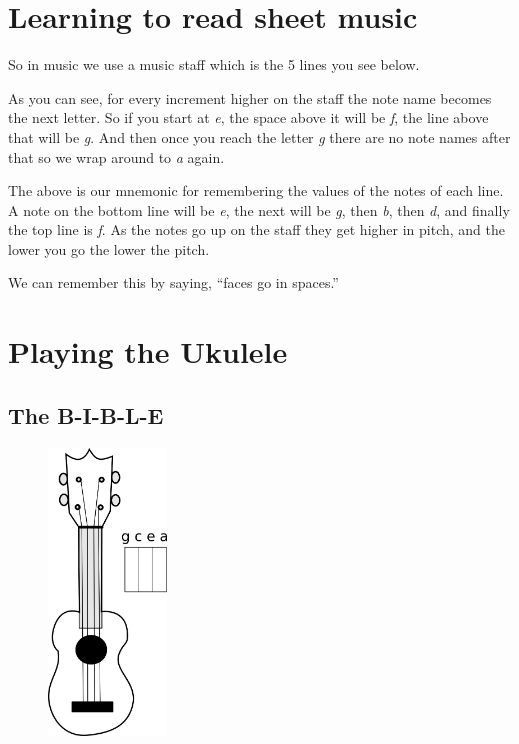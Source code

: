 \documentclass[12pt]{article}
\begin{document}
\section{Learning to read sheet music}

So in music we use a music staff which is the 5 lines you see below.

{%
\parindent 0pt
\noindent
\ifx\preLilyPondExample \undefined
\else
  \expandafter\preLilyPondExample
\fi
\def\lilypondbook{}%

\ifx\postLilyPondExample \undefined
\else
  \expandafter\postLilyPondExample
\fi
}

As you can see, for every increment higher on the staff the note name becomes the next letter. So if you start at \emph{e}, the space above it will be \emph{f}, the line above that will be \emph{g}.
And then once you reach the letter \emph{g} there are no note names after that so we wrap around to \emph{a} again.


{%
\parindent 0pt
\noindent
\ifx\preLilyPondExample \undefined
\else
  \expandafter\preLilyPondExample
\fi
\def\lilypondbook{}%

\ifx\postLilyPondExample \undefined
\else
  \expandafter\postLilyPondExample
\fi
}

The above is our mnemonic for remembering the values of the notes of each line. A note on the bottom line will be \emph{e}, the next will be \emph{g}, then \emph{b}, then \emph{d}, and finally the top line is \emph{f}. As the notes go up on the staff they get higher in pitch, and the lower you go the lower the pitch.


{%
\parindent 0pt
\noindent
\ifx\preLilyPondExample \undefined
\else
  \expandafter\preLilyPondExample
\fi
\def\lilypondbook{}%

\ifx\postLilyPondExample \undefined
\else
  \expandafter\postLilyPondExample
\fi
}

We can remember this by saying, ``faces go in spaces.''

\section{Playing the Ukulele}
\subsection{The B-I-B-L-E}

\begin{figure}[ht!]
\centering
\includegraphics[height=3in]{ukulele.png}
\end{figure}
\end{document}
